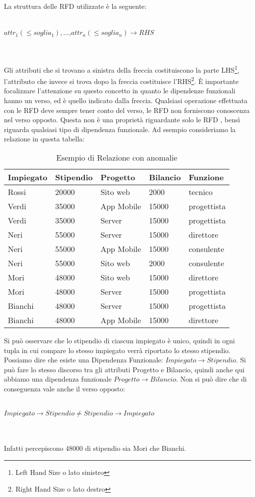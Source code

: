 La struttura delle RFD utilizzate è la seguente:
\\~\\
\centerline{$attr_1(\leq soglia_1),\ldots$,$attr_n(\leq soglia_n) \xrightarrow{} RHS$}
\\~\\
Gli attributi che si trovano a sinistra della freccia costituiscono la parte LHS\footnote{Left Hand Size o lato sinistro}, l'attributo che invece si trova dopo la freccia costituisce l'RHS\footnote{Right Hand Size o lato destro}. 
È importante focalizzare l'attenzione su questo concetto in quanto le dipendenze funzionali hanno un verso, ed è quello indicato dalla freccia. Qualsiasi operazione effettuata con le RFD deve sempre tener conto del verso, le RFD non forniscono conoscenza nel verso opposto. Questa non è una proprietà riguardante solo le RFD , bensì riguarda qualsiasi tipo di dipendenza funzionale.
Ad esempio consideriamo la relazione in questa tabella:
\begin{table}[H]
    \centering
    \begin{tabular}{|l |l |l |l |l |}
    \hline
     Impiegato & Stipendio & Progetto & Bilancio & Funzione \\
    \hline
    Rossi & 20000  & Sito web & 2000 & tecnico\\
    Verdi & 35000 & App Mobile & 15000 & progettista\\
    Verdi & 35000 & Server & 15000 & progettista\\
    Neri & 55000 & Server & 15000 & direttore\\
    Neri & 55000 & App Mobile & 15000 & consulente\\
    Neri & 55000 & Sito web & 2000 & consulente\\
    Mori & 48000 & Sito web & 15000 & direttore\\
    Mori & 48000 & Server & 15000 & progettista\\
    Bianchi & 48000 & Server & 15000 & progettista\\
    Bianchi & 48000 & App Mobile & 15000 & direttore\\
    \hline
    \end{tabular}
    \caption{Esempio di Relazione con anomalie}
    \label{tab:relationship_anomalies}
\end{table}
Si può osservare che lo stipendio di ciascun impiegato è unico, quindi in ogni tupla in cui compare lo stesso impiegato verrà riportato lo stesso stipendio. Possiamo dire che esiste una Dipendenza Funzionale: 
$Impiegato \xrightarrow{} Stipendio$. 
Si può fare lo stesso discorso tra gli attributi Progetto e Bilancio, quindi anche qui abbiamo una dipendenza funzionale
$Progetto\xrightarrow{}Bilancio$. 
Non si può dire che di conseguenza vale anche il verso opposto:
\\~\\
\centerline{$Impiegato \xrightarrow{} Stipendio \neq Stipendio \xrightarrow{} Impiegato$} 
\\~\\
Infatti percepiscono 48000 di stipendio sia Mori che Bianchi.\cite{libroCeri}